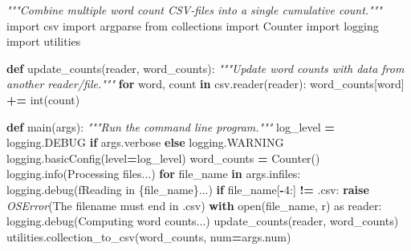\documentclass[
]{krantz}
\makeatletter
\newenvironment{Shaded}{\begin{snugshade}}{\end{snugshade}}
\newcommand{\BuiltInTok}[1]{#1}
\newcommand{\CommentTok}[1]{\textcolor[rgb]{0.56,0.35,0.01}{\textit{#1}}}
\newcommand{\ControlFlowTok}[1]{\textcolor[rgb]{0.13,0.29,0.53}{\textbf{#1}}}
\newcommand{\DecValTok}[1]{\textcolor[rgb]{0.00,0.00,0.81}{#1}}
\newcommand{\ImportTok}[1]{#1}
\newcommand{\KeywordTok}[1]{\textcolor[rgb]{0.13,0.29,0.53}{\textbf{#1}}}
\newcommand{\NormalTok}[1]{#1}
\newcommand{\OperatorTok}[1]{\textcolor[rgb]{0.81,0.36,0.00}{\textbf{#1}}}
\newcommand{\PreprocessorTok}[1]{\textcolor[rgb]{0.56,0.35,0.01}{\textit{#1}}}
\newcommand{\SpecialCharTok}[1]{\textcolor[rgb]{0.00,0.00,0.00}{#1}}
\newcommand{\SpecialStringTok}[1]{\textcolor[rgb]{0.31,0.60,0.02}{#1}}
\newcommand{\StringTok}[1]{\textcolor[rgb]{0.31,0.60,0.02}{#1}}
\newenvironment{kframe}{%
\medskip{}
\setlength{\fboxsep}{.8em}
 \def\at@end@of@kframe{}%
 \ifinner\ifhmode%
  \def\at@end@of@kframe{\end{minipage}}%
  \begin{minipage}{\columnwidth}%
 \fi\fi%
 \def\FrameCommand##1{\hskip\@totalleftmargin \hskip-\fboxsep
 \colorbox{shadecolor}{##1}\hskip-\fboxsep
     \hskip-\linewidth \hskip-\@totalleftmargin \hskip\columnwidth}%
 \MakeFramed {\advance\hsize-\width
   \@totalleftmargin\z@ \linewidth\hsize
   \@setminipage}}%
 {\par\unskip\endMakeFramed%
 \at@end@of@kframe}
\renewenvironment{Shaded}{\begin{kframe}}{\end{kframe}}
\makeatother
\begin{document}
\begin{Shaded}
\begin{Highlighting}[]
\CommentTok{"""Combine multiple word count CSV{-}files into a single cumulative count."""}
\ImportTok{import}\NormalTok{ csv}
\ImportTok{import}\NormalTok{ argparse}
\ImportTok{from}\NormalTok{ collections }\ImportTok{import}\NormalTok{ Counter}
\ImportTok{import}\NormalTok{ logging}
\ImportTok{import}\NormalTok{ utilities}


\KeywordTok{def}\NormalTok{ update\_counts(reader, word\_counts):}
    \CommentTok{"""Update word counts with data from another reader/file."""}
    \ControlFlowTok{for}\NormalTok{ word, count }\KeywordTok{in}\NormalTok{ csv.reader(reader):}
\NormalTok{        word\_counts[word] }\OperatorTok{+=} \BuiltInTok{int}\NormalTok{(count)}

\KeywordTok{def}\NormalTok{ main(args):}
    \CommentTok{"""Run the command line program."""}
\NormalTok{    log\_level }\OperatorTok{=}\NormalTok{ logging.DEBUG }\ControlFlowTok{if}\NormalTok{ args.verbose }\ControlFlowTok{else}\NormalTok{ logging.WARNING}
\NormalTok{    logging.basicConfig(level}\OperatorTok{=}\NormalTok{log\_level)}
\NormalTok{    word\_counts }\OperatorTok{=}\NormalTok{ Counter()}
\NormalTok{    logging.info(}\StringTok{\textquotesingle{}Processing files...\textquotesingle{}}\NormalTok{)}
    \ControlFlowTok{for}\NormalTok{ file\_name }\KeywordTok{in}\NormalTok{ args.infiles:}
\NormalTok{        logging.debug(}\SpecialStringTok{f\textquotesingle{}Reading in }\SpecialCharTok{\{}\NormalTok{file\_name}\SpecialCharTok{\}}\SpecialStringTok{...\textquotesingle{}}\NormalTok{)}
        \ControlFlowTok{if}\NormalTok{ file\_name[}\OperatorTok{{-}}\DecValTok{4}\NormalTok{:] }\OperatorTok{!=} \StringTok{\textquotesingle{}.csv\textquotesingle{}}\NormalTok{:}
            \ControlFlowTok{raise} \PreprocessorTok{OSError}\NormalTok{(}\StringTok{\textquotesingle{}The filename must end in \textasciigrave{}.csv\textasciigrave{}\textquotesingle{}}\NormalTok{)}
        \ControlFlowTok{with} \BuiltInTok{open}\NormalTok{(file\_name, }\StringTok{\textquotesingle{}r\textquotesingle{}}\NormalTok{) }\ImportTok{as}\NormalTok{ reader:}
\NormalTok{            logging.debug(}\StringTok{\textquotesingle{}Computing word counts...\textquotesingle{}}\NormalTok{)}
\NormalTok{            update\_counts(reader, word\_counts)}
\NormalTok{    utilities.collection\_to\_csv(word\_counts, num}\OperatorTok{=}\NormalTok{args.num)}


\end{Highlighting}
\end{Shaded}
\end{document}
